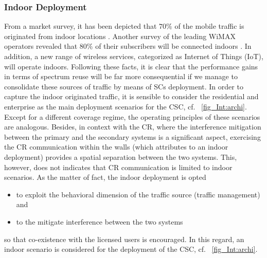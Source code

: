\subsubsection*{Indoor Deployment}
From a market survey, it has been depicted that $70\%$ of the mobile traffic is originated from indoor locations \cite{Chander08}. Another survey of the leading WiMAX operators revealed that $80\%$ of their subscribers will be connected indoors \cite{Pao07}. In addition, a new range of wireless services, categorized as Internet of Things (IoT), will operate indoors. Following these facts, it is clear that the performance gains in terms of spectrum reuse will be far more consequential if we manage to consolidate these sources of traffic by means of SCs deployment. In order to capture the indoor originated traffic, it is sensible to consider the residential and enterprise as the main deployment scenarios for the CSC, cf. \figurename~\ref{fig_Int:archi}. Except for a different coverage regime, the operating principles of these scenarios are analogous. Besides, in context with the CR, where the interference mitigation between the primary and the secondary systems is a significant aspect, exercising the CR communication within the walls (which attributes to an indoor deployment) provides a spatial separation between the two systems. This, however, does not indicates that CR communication is limited to indoor scenarios. As the matter of fact, the indoor deployment is opted \begin{itemize} \item to exploit the behavioral dimension of the traffic source (traffic management) and \item to the mitigate interference between the two systems \end{itemize} so that co-existence with the licensed users is encouraged. 
In this regard, an indoor scenario is considered for the deployment of the CSC, cf. \figurename~\ref{fig_Int:archi}.  

